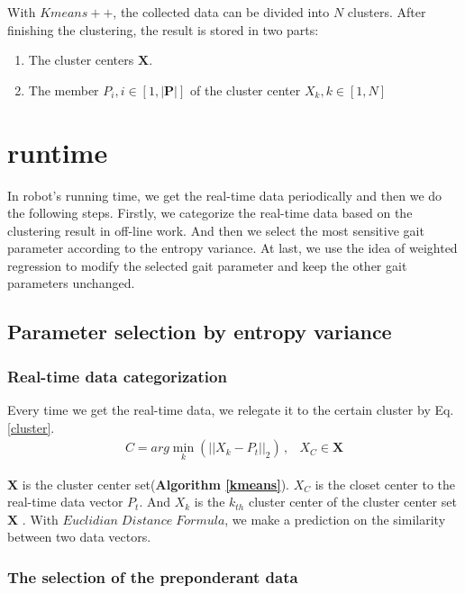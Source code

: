 With $Kmeans++$, the collected data can be divided into $N$ clusters. After finishing the clustering, the result is stored in two parts:

\begin{enumerate}
	\item The cluster centers $\textbf{X}$.
	\item The member $P_{i},i \in [1,\vert \bm{P} \vert]$ of the cluster center $X_{k},k \in [1,N]$
\end{enumerate}

\section{runtime}
In robot's running time, we get the real-time data periodically and then we do the following steps. Firstly, we categorize the real-time data based on the clustering result in off-line work. And then we select the most sensitive gait parameter according to the entropy variance. At last, we use the idea of weighted regression to modify the selected gait parameter and keep the other gait parameters unchanged.
\subsection{Parameter selection by entropy variance}

\subsubsection{Real-time data categorization}

Every time we get the real-time data, we relegate it to the certain cluster by Eq.\ref{cluster}.
\begin{eqnarray}\label{cluster}
C=arg\min \limits_{k}{(||X_{k}-P_{t}||_{2})} \, ,&X_{C}\in \bm{X}
\end{eqnarray}

$\bm{X}$ is the cluster center set(\textbf{Algorithm \ref{kmeans}}). $X_{C}$ is the closet center to the real-time data vector $P_t$. And $X_{k}$ is the $k_{th}$ cluster center of the cluster center set $\bm{X}$ . With $Euclidian \; Distance \; Formula$, we make a prediction on the similarity between two data vectors.

\subsubsection{The selection of the preponderant data}

